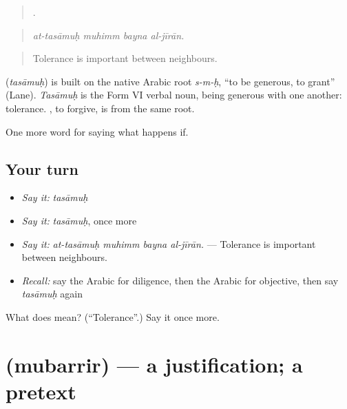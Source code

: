 \begin{quote}
   .
\end{quote}

\begin{quote}
\emph{at-tasāmuḥ muhimm bayna al-jīrān.}
\end{quote}

\begin{quote}
Tolerance is important between neighbours.
\end{quote}

\begin{cousinweb}
\textbf{} (\emph{tasāmuḥ}) is built on the native Arabic root \emph{s-m-ḥ}, \textquotedblleft{}to be generous, to grant\textquotedblright{} (Lane). \emph{Tasāmuḥ} is the Form VI verbal noun, being generous with one another: tolerance. , to forgive, is from the same root.
\end{cousinweb}

\begin{grammarlens}[title={What you've built}]
One more word for saying what happens if.
\end{grammarlens}

\subsection*{Your turn}
\begin{itemize}
\raggedright
  \item \emph{Say it:} \emph{tasāmuḥ}
  \item \emph{Say it:} \emph{tasāmuḥ}, once more
  \item \emph{Say it:} \emph{at-tasāmuḥ muhimm bayna al-jīrān.} — Tolerance is important between neighbours.
  \item \emph{Recall:} say the Arabic for diligence, then the Arabic for objective, then say \emph{tasāmuḥ} again
\end{itemize}

\begin{tcolorbox}[breakable,colback=teal!4,colframe=teal!35!black,title={Before you move on}]
What does  mean? (\textquotedblleft{}Tolerance\textquotedblright{}.) Say it once more.
\end{tcolorbox}
\section[\texorpdfstring{\ar{مبرر} (mubarrir)}{مبرر (mubarrir)}]{ (mubarrir) — a justification; a pretext}

